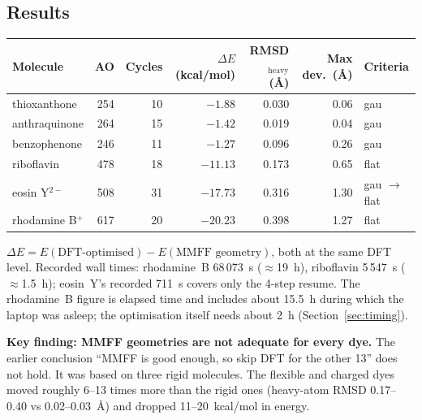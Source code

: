 \documentclass[11pt,a4paper]{article}
\newcommand{\notehead}[2]{\par\smallskip\noindent\textbf{#1: #2.}\enspace}
\begin{document}
\subsection{Results}
\begin{center}\small
\begin{tabular}{@{}lrrrrrl@{}}
\toprule
Molecule & AO & Cycles & $\Delta E$ (kcal/mol) & RMSD$_\text{heavy}$ (\AA) & Max dev.\ (\AA) & Criteria \\
\midrule
thioxanthone & 254 & 10 & $-1.88$ & 0.030 & 0.06 & gau \\
anthraquinone & 264 & 15 & $-1.42$ & 0.019 & 0.04 & gau \\
benzophenone & 246 & 11 & $-1.27$ & 0.096 & 0.26 & gau \\
\midrule
riboflavin & 478 & 18 & $-11.13$ & 0.173 & 0.65 & flat \\
eosin Y$^{2-}$ & 508 & 31 & $-17.73$ & 0.316 & 1.30 & gau $\to$ flat \\
rhodamine B$^+$ & 617 & 20 & $-20.23$ & 0.398 & 1.27 & flat \\
\bottomrule
\end{tabular}
\end{center}
\noindent $\Delta E = E(\text{DFT-optimised}) - E(\text{MMFF geometry})$, both at the same DFT
level. Recorded wall times: rhodamine~B 68\,073~s ($\approx$19~h), riboflavin 5\,547~s ($\approx$1.5~h);
eosin~Y's recorded 711~s covers only the 4-step resume. The rhodamine~B figure is elapsed time and
includes about 15.5~h during which the laptop was asleep; the optimisation itself needs about 2~h
(Section~\ref{sec:timing}).

\notehead{Key finding}{MMFF geometries are not adequate for every dye}
The earlier conclusion ``MMFF is good enough, so skip DFT for the other 13'' does not hold. It
was based on three rigid molecules. The flexible and charged dyes moved roughly 6--13 times more than the rigid
ones (heavy-atom RMSD 0.17--0.40 vs 0.02--0.03~\AA) and dropped 11--20~kcal/mol in energy.
\par\smallskip
\end{document}
